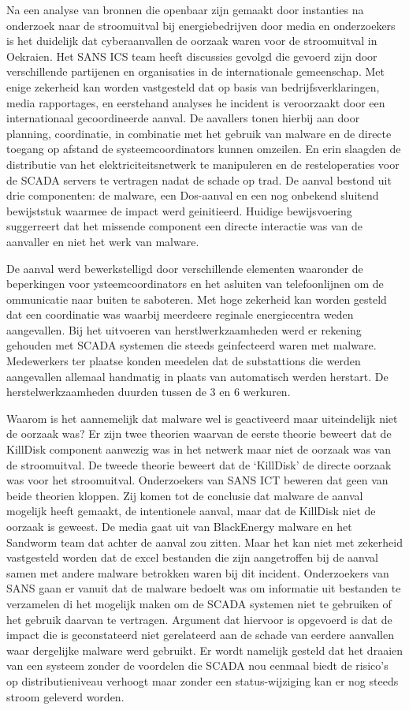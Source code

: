 Na een analyse van bronnen die openbaar zijn gemaakt door instanties na onderzoek naar de
stroomuitval bij energiebedrijven door media en onderzoekers is het duidelijk dat cyberaanvallen de
oorzaak waren voor de stroomuitval in Oekraien. Het SANS ICS team heeft discussies gevolgd die
gevoerd zijn door verschillende partijenen en organisaties in de internationale gemeenschap. Met
enige zekerheid kan worden vastgesteld dat op basis van bedrijfsverklaringen, media rapportages, en
eerstehand analyses he incident is veroorzaakt door een internationaal gecoordineerde aanval.
De aavallers tonen hierbij aan door planning, coordinatie, in combinatie met het gebruik van
malware en de directe toegang op afstand de systeemcoordinators kunnen omzeilen. En erin
slaagden de distributie van het elektriciteitsnetwerk te manipuleren en de resteloperaties voor de
SCADA servers te vertragen nadat de schade op trad. De aanval bestond uit drie componenten: de
malware, een Dos-aanval en een nog onbekend sluitend bewijststuk waarmee de impact werd
geinitieerd. Huidige bewijsvoering suggerreert dat het missende component een directe interactie
was van de aanvaller en niet het werk van malware.

De aanval werd bewerkstelligd door verschillende elementen waaronder de beperkingen voor
ysteemcoordinators en het asluiten van telefoonlijnen om de ommunicatie naar buiten te saboteren.
Met hoge zekerheid kan worden gesteld dat een coordinatie was waarbij meerdeere reginale
energiecentra weden aangevallen.
Bij het uitvoeren van herstlwerkzaamheden werd er rekening gehouden met SCADA systemen die
steeds geinfecteerd waren met malware. Medewerkers ter plaatse konden meedelen dat de
substattions die werden aangevallen allemaal handmatig in plaats van automatisch werden herstart.
De herstelwerkzaamheden duurden tussen de 3 en 6 werkuren.

Waarom is het aannemelijk dat malware wel is geactiveerd maar uiteindelijk niet de oorzaak was?
Er zijn twee theorien waarvan de eerste theorie beweert dat de KillDisk component aanwezig was in
het netwerk maar niet de oorzaak was van de stroomuitval. De tweede theorie beweert dat de
‘KillDisk’ de directe oorzaak was voor het stroomuitval. Onderzoekers van SANS ICT beweren dat
geen van beide theorien kloppen. Zij komen tot de conclusie dat malware de aanval mogelijk heeft
gemaakt, de intentionele aanval, maar dat de KillDisk niet de oorzaak is geweest. De media gaat uit
van BlackEnergy malware en het Sandworm team dat achter de aanval zou zitten. Maar het kan niet
met zekerheid vastgesteld worden dat de excel bestanden die zijn aangetroffen bij de aanval samen
met andere malware betrokken waren bij dit incident. Onderzoekers van SANS gaan er vanuit dat de
malware bedoelt was om informatie uit bestanden te verzamelen di het mogelijk maken om de
SCADA systemen niet te gebruiken of het gebruik daarvan te vertragen. Argument dat hiervoor is
opgevoerd is dat de impact die is geconstateerd niet gerelateerd aan de schade van eerdere
aanvallen waar dergelijke malware werd gebruikt. Er wordt namelijk gesteld dat het draaien van een
systeem zonder de voordelen die SCADA nou eenmaal biedt de risico’s op distributieniveau verhoogt
maar zonder een status-wijziging kan er nog steeds stroom geleverd worden.

